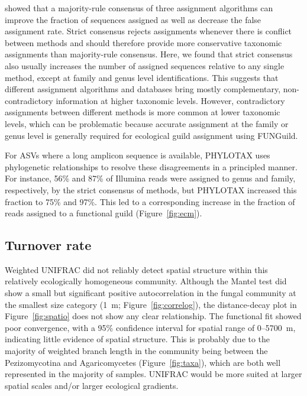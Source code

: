 \documentclass[
  12pt,
]{article}
\begin{document}
\textcite{gdanetz2017} showed that a majority-rule consensus of three assignment algorithms can improve the fraction of sequences assigned as well as decrease the false assignment rate.
Strict consensus rejects assignments whenever there is conflict between methods and should therefore provide more conservative taxonomic assignments than majority-rule consensus.
Here, we found that strict consensus also usually increases the number of assigned sequences relative to any single method, except at family and genus level identifications.
This suggests that different assignment algorithms and databases bring mostly complementary, non-contradictory information at higher taxonomic levels.
However, contradictory assignments between different methods is more common at lower taxonomic levels, which can be problematic because accurate assignment at the family or genus level is generally required for ecological guild assignment using FUNGuild.

For ASVs where a long amplicon sequence is available, PHYLOTAX uses phylogenetic relationships to resolve these disagreements in a principled manner.
For instance, 56\% and 87\% of Illumina reads were assigned to genus and family, respectively, by the strict consensus of methods, but PHYLOTAX increased this fraction to 75\% and 97\%.
This led to a corresponding increase in the fraction of reads assigned to a functional guild (Figure~\ref{fig:ecm}).

\hypertarget{turnover-rate}{%
\subsection{Turnover rate}\label{turnover-rate}}

Weighted UNIFRAC did not reliably detect spatial structure within this relatively ecologically homogeneous community.
Although the Mantel test did show a small but significant positive autocorrelation in the fungal community at the smallest size category (1~m; Figure~\ref{fig:correlog}), the distance-decay plot in Figure~\ref{fig:spatio} does not show any clear relationship.
The functional fit showed poor convergence, with a 95\% confidence interval for spatial range of 0--5700~m, indicating little evidence of spatial structure.
This is probably due to the majority of weighted branch length in the community being between the Pezizomycotina and Agaricomycetes (Figure~\ref{fig:taxa}), which are both well represented in the majority of samples.
UNIFRAC would be more suited at larger spatial scales and/or larger ecological gradients.
\end{document}

